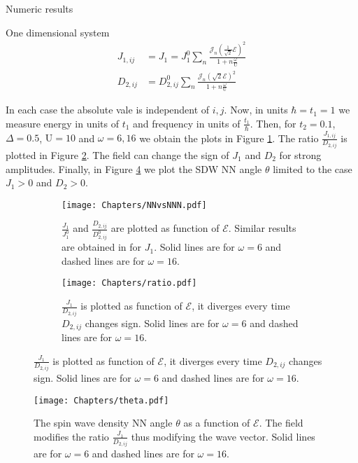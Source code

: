 \begin{section}{Numeric results}
\begin{subsection}{One dimensional system}
\begin{align}
J_{1,ij} &= J_{1} = J_{1}^0  \sum_{n} \frac{\mathcal{J}_n(\frac{1}{\sqrt{2}}\mathcal{E})^2}{1+n\frac{\omega}{\text{U}}} \\
D_{2,ij} &= D_{2,ij}^0  \sum_{n} \frac{\mathcal{J}_n(\sqrt{2}\mathcal{E})^2}{1+n\frac{\omega}{\text{U}}}
\end{align}

In each case the absolute vale is independent of $i,j$.  Now, in units $\hbar=t_1=1$ we measure energy in units of $t_1$ and frequency in units of $\frac{t_1}{\hbar}$. Then, for $t_2 = 0.1$, $\Delta = 0.5$, $\text{U} = 10$ and $\omega = 6, 16$ we obtain the plots in Figure \ref{Fig3.1:NNvsNNN}. The ratio $\frac{J_{1,ij}}{D_{2,ij}}$ is plotted in Figure \ref{Fig3.1:ratio}. The field can change the sign of $J_1$ and $D_2$ for strong amplitudes. Finally, in Figure \ref{Fig3.2} we plot the SDW NN angle $\theta$ limited to the case $J_1 > 0$ and $D_2 > 0$.

\begin{figure}
\centering
\begin{subfigure}{.45\textwidth}
  \texttt{[image: Chapters/NNvsNNN.pdf]}
  \caption{$\frac{J_{1}}{J_{1}^0}$ and $\frac{D_{2,ij}}{D_{2,ij}^0}$ are plotted as function of $\mathcal{E}$. Similar results are obtained in \cite{Mentink2015} for $J_{1}$. Solid lines are for $\omega = 6$ and dashed lines are for $\omega = 16$.}
  \label{Fig3.1:NNvsNNN}
\end{subfigure}%
\hspace*{\fill}
\begin{subfigure}{.45\textwidth}
  \texttt{[image: Chapters/ratio.pdf]}
  \caption{$\frac{J_{1}}{D_{2,ij}}$ is plotted as function of $\mathcal{E}$, it diverges every time $D_{2,ij}$ changes sign. Solid lines are for $\omega = 6$ and dashed lines are for $\omega = 16$.}
  \label{Fig3.1:ratio}
\end{subfigure}
\label{Fig3.1}
\end{figure}

\begin{figure}
\centering
  \texttt{[image: Chapters/theta.pdf]}
  \caption{The spin wave density NN angle $\theta$ as a function of $\mathcal{E}$. The field modifies the ratio $\frac{J_{1}}{D_{2,ij}}$ thus modifying the wave vector. Solid lines are for $\omega = 6$ and dashed lines are for $\omega = 16$.}
\label{Fig3.2}
\end{figure}


\end{subsection}
\end{section}
